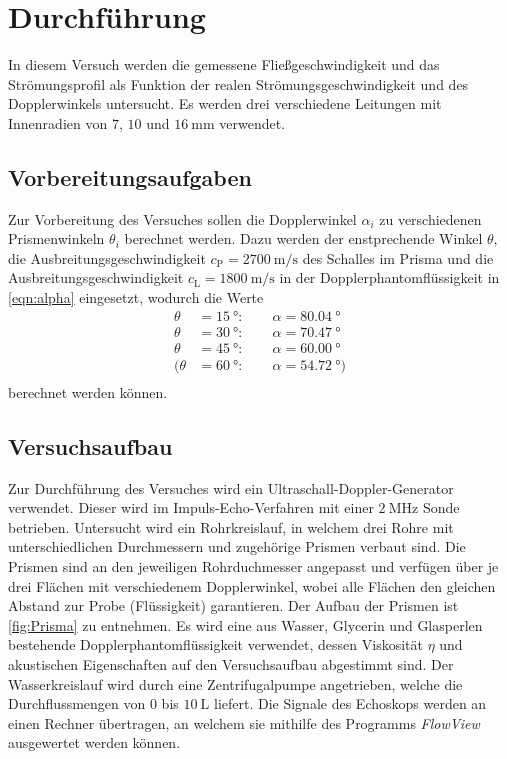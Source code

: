 \section{Durchführung}
\label{sec:Durchführung}
In diesem Versuch werden die gemessene Fließgeschwindigkeit und das Strömungsprofil als Funktion der realen Strömungsgeschwindigkeit und des Dopplerwinkels untersucht. 
Es werden drei verschiedene Leitungen mit Innenradien von $7$, $10$ und $\qty{16}{\milli\metre}$ verwendet. 

\subsection{Vorbereitungsaufgaben}
\label{subsec:Vorbereitung}
Zur Vorbereitung des Versuches sollen die Dopplerwinkel $\alpha_i$ zu verschiedenen Prismenwinkeln $\theta_i$ berechnet werden. Dazu werden der enstprechende Winkel
$\theta$, die Ausbreitungsgeschwindigkeit $c_\text{P} = \qty{2700}{\metre\per\second}$ des Schalles im Prisma und die Ausbreitungsgeschwindigkeit
$c_\text{L} = \qty{1800}{\metre\per\second}$ in der Dopplerphantomflüssigkeit in \autoref{eqn:alpha} eingesetzt, wodurch die Werte
\begin{align*}
    \theta &= \qty{15}{\degree}: \qquad \alpha = \qty{80.04}{\degree} \\
    \theta &= \qty{30}{\degree}: \qquad \alpha = \qty{70.47}{\degree} \\
    \theta &= \qty{45}{\degree}: \qquad \alpha = \qty{60.00}{\degree} \\
    (\theta &= \qty{60}{\degree}: \qquad \alpha = \qty{54.72}{\degree}) \\
\end{align*} 
berechnet werden können.

\subsection{Versuchsaufbau}
\label{subsec:Aufbau}
Zur Durchführung des Versuches wird ein Ultraschall-Doppler-Generator verwendet. Dieser wird im Impuls-Echo-Verfahren mit einer $\qty{2}{\mega\hertz}$ Sonde betrieben.
Untersucht wird ein Rohrkreislauf, in welchem drei Rohre mit unterschiedlichen Durchmessern und zugehörige Prismen verbaut sind. Die Prismen sind an den jeweiligen
Rohrduchmesser angepasst und verfügen über je drei Flächen mit verschiedenem Dopplerwinkel, wobei alle Flächen den gleichen Abstand zur Probe (Flüssigkeit) garantieren.  
Der Aufbau der Prismen ist \autoref{fig:Prisma} zu entnehmen. Es wird eine aus Wasser, Glycerin und
Glasperlen bestehende Dopplerphantomflüssigkeit verwendet, dessen Viskosität $\eta$ und akustischen Eigenschaften auf den Versuchsaufbau abgestimmt sind.
Der Wasserkreislauf wird durch eine Zentrifugalpumpe angetrieben, welche die Durchflussmengen von $0$ bis $\qty{10}{\liter}$ liefert.
Die Signale des Echoskops werden an einen Rechner übertragen, an welchem sie mithilfe des Programms \textit{FlowView} ausgewertet werden können.

